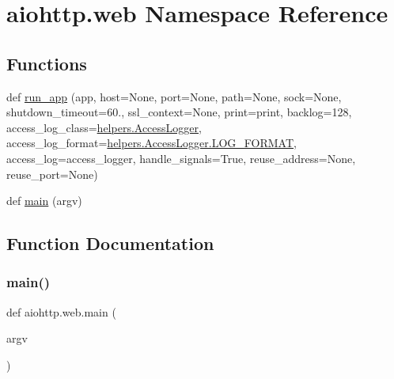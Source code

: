 \hypertarget{namespaceaiohttp_1_1web}{}\section{aiohttp.\+web Namespace Reference}
\label{namespaceaiohttp_1_1web}
\subsection*{Functions}
\begin{DoxyCompactItemize}
\item 
def \hyperlink{namespaceaiohttp_1_1web_a4346feaf88d9ad0601c10a7c26e7422c}{run\+\_\+app} (app, host=None, port=None, path=None, sock=None, shutdown\+\_\+timeout=60., ssl\+\_\+context=None, print=print, backlog=128, access\+\_\+log\+\_\+class=\hyperlink{classaiohttp_1_1helpers_1_1_access_logger}{helpers.\+Access\+Logger}, access\+\_\+log\+\_\+format=\hyperlink{classaiohttp_1_1helpers_1_1_access_logger_afe6ba89c38a66f34c42fd1c1dd0f79a1}{helpers.\+Access\+Logger.\+L\+O\+G\+\_\+\+F\+O\+R\+M\+AT}, access\+\_\+log=access\+\_\+logger, handle\+\_\+signals=True, reuse\+\_\+address=None, reuse\+\_\+port=None)
\item 
def \hyperlink{namespaceaiohttp_1_1web_a8336da8ba001f06e7da8f92cc98e0653}{main} (argv)
\end{DoxyCompactItemize}


\subsection{Function Documentation}
\mbox{\label{namespaceaiohttp_1_1web_a8336da8ba001f06e7da8f92cc98e0653}} 
\subsubsection{\texorpdfstring{main()}{main()}}
{\footnotesize\ttfamily def aiohttp.\+web.\+main (\begin{DoxyParamCaption}\item[{}]{argv }\end{DoxyParamCaption})}

\mbox{\label{namespaceaiohttp_1_1web_a4346feaf88d9ad0601c10a7c26e7422c}} 
